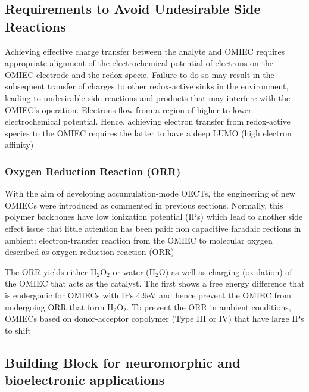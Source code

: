 \subsection{Requirements to Avoid Undesirable Side Reactions}


Achieving effective charge transfer between the analyte and OMIEC requires appropriate alignment of the electrochemical potential of electrons on the OMIEC electrode and the redox specie. Failure to do so may result in the subsequent transfer of charges to other redox-active sinks in the environment, leading to undesirable side reactions and products that may interfere with the OMIEC’s operation. Electrons flow from a region of higher to lower electrochemical potential. Hence, achieving electron transfer from redox-active species to the OMIEC requires the latter to have a deep LUMO (high electron affinity) \cite{tanMixedIonicElectronic2022} %

\subsubsection{Oxygen Reduction Reaction (ORR)}

With the aim of developing accumulation-mode OECTs, the engineering of new OMIECs were introduced as commented in previous sections. Normally, this polymer backbones have low ionization potential (IPs) which lead to another side effect issue that little attention has been paid: non capacitive faradaic rections in ambient: electron-transfer reaction from the OMIEC to molecular oxygen described as oxygen reduction reaction (ORR)


The ORR yields either H$_{2}$O$_{2}$ or water (H$_{2}$O) as well as charging (oxidation) of the OMIEC that acts as the catalyst. The first shows a free energy difference that is endergonic for OMIECs with IPs \> 4.9eV and hence prevent the OMIEC from undergoing ORR that form H$_{2}$O$_{2}$. To prevent the ORR in ambient conditions, OMIECs based on donor-acceptor copolymer (Type III or IV) that have large IPs to shift
\cite{giovannittiEnergeticControlRedoxActive2020}

\subsection{Building Block for neuromorphic and bioelectronic applications}




